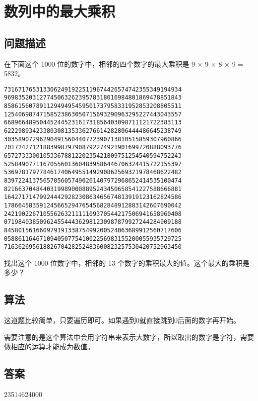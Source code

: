 \section{数列中的最大乘积}\label{sec:problem08}
\subsection{问题描述}
\begin{tcolorbox}
在下面这个 1000 位的数字中，相邻的四个数字的最大乘积是 9 × 9 × 8 × 9 = 5832。

\begin{verbatim}
73167176531330624919225119674426574742355349194934
96983520312774506326239578318016984801869478851843
85861560789112949495459501737958331952853208805511
12540698747158523863050715693290963295227443043557
66896648950445244523161731856403098711121722383113
62229893423380308135336276614282806444486645238749
30358907296290491560440772390713810515859307960866
70172427121883998797908792274921901699720888093776
65727333001053367881220235421809751254540594752243
52584907711670556013604839586446706324415722155397
53697817977846174064955149290862569321978468622482
83972241375657056057490261407972968652414535100474
82166370484403199890008895243450658541227588666881
16427171479924442928230863465674813919123162824586
17866458359124566529476545682848912883142607690042
24219022671055626321111109370544217506941658960408
07198403850962455444362981230987879927244284909188
84580156166097919133875499200524063689912560717606
05886116467109405077541002256983155200055935729725
71636269561882670428252483600823257530420752963450
\end{verbatim}

找出这个 1000 位数字中，相邻的 13 个数字的乘积最大的值。这个最大的乘积是多少？
\end{tcolorbox}

\subsection{算法}
这道题比较简单，只要遍历即可。如果遇到0就直接跳到0后面的数字再开始。

需要注意的是这个算法中会用字符串来表示大数字，所以取出的数字是字符，需要做相应的运算才能成为数值。

\subsection{答案}
23514624000
